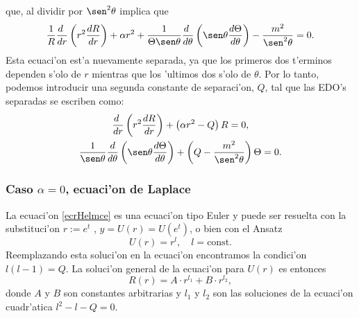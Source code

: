 que, al dividir por $\sen^2\theta$ implica que
\begin{equation}
\frac{1}{R}\frac{d\ }{dr}\left(r^2\frac{dR}{dr}\right)+\alpha r^2
+\frac{1}{\Theta\sen\theta}\frac{d\ }{d\theta}\left(\sen\theta\frac{
d\Theta}{d\theta}\right) -\frac{m^2}{\sen^2\theta} = 0.
 \end{equation}
Esta ecuaci'on est'a nuevamente separada, ya que los primeros dos t'erminos dependen s'olo de $r$ mientras que los 'ultimos dos s'olo de $\theta$. Por lo tanto, podemos introducir una segunda constante de separaci'on, $Q$, tal que las EDO's separadas se escriben como:
\begin{gather}
\frac{d\ }{dr}\left(r^2\frac{dR}{dr}\right)+\left(\alpha r^2-Q\right)R=0, \label{ecrHelmce}\\
\frac{1}{\sen\theta}\frac{d}{d\theta}\left(\sen\theta\frac{d\Theta}{d\theta}\right)
+\left(Q-\frac{m^2}{\sen^2\theta}\right) \Theta = 0. \label{ecThHelm}
\end{gather}

\subsubsection{Caso $\alpha=0$, ecuaci'on de Laplace}
 La ecuaci'on \eqref{ecrHelmce} es una ecuaci'on tipo Euler y puede ser resuelta con la
substituci'on $r:=e^t$ , $y=U(r)=U(e^t)$, o bien con el Ansatz
 \begin{equation}
  U(r) = r^l,\quad l=\text{const.}
\end{equation}
  Reemplazando esta soluci'on en la ecuaci'on encontramos la condici'on
 $l(l-1)=Q$. La soluci'on general de la ecuaci'on para $U(r)$ es entonces
\begin{equation}
 R(r) = A\cdot r^{l_1} + B\cdot r^{l_2},\label{loes2}
\end{equation}
donde $A$ y $B$ son constantes arbitrarias y $l_1$ y $l_2$ son las soluciones de la ecuaci'on cuadr'atica $l^2-l-Q=0$. 


